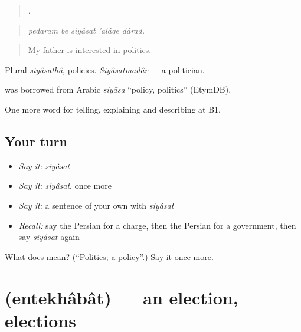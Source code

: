 \begin{quote}
    .
\end{quote}

\begin{quote}
\emph{pedaram be siyâsat 'alâqe dârad.}
\end{quote}

\begin{quote}
My father is interested in politics.
\end{quote}

Plural \emph{siyâsathâ}, policies. \emph{Siyâsatmadâr} — a politician.

\begin{cousinweb}
\textbf{} was borrowed from Arabic \emph{siyāsa} \textquotedblleft{}policy, politics\textquotedblright{} (EtymDB).
\end{cousinweb}

\begin{grammarlens}[title={What you've built}]
One more word for telling, explaining and describing at B1.
\end{grammarlens}

\subsection*{Your turn}
\begin{itemize}
\raggedright
  \item \emph{Say it:} \emph{siyâsat}
  \item \emph{Say it:} \emph{siyâsat}, once more
  \item \emph{Say it:} a sentence of your own with \emph{siyâsat}
  \item \emph{Recall:} say the Persian for a charge, then the Persian for a government, then say \emph{siyâsat} again
\end{itemize}

\begin{tcolorbox}[breakable,colback=teal!4,colframe=teal!35!black,title={Before you move on}]
What does  mean? (\textquotedblleft{}Politics; a policy\textquotedblright{}.) Say it once more.
\end{tcolorbox}
\section[\texorpdfstring{\fa{انتخابات} (entekhâbât)}{انتخابات (entekhâbât)}]{ (entekhâbât) — an election, elections}

